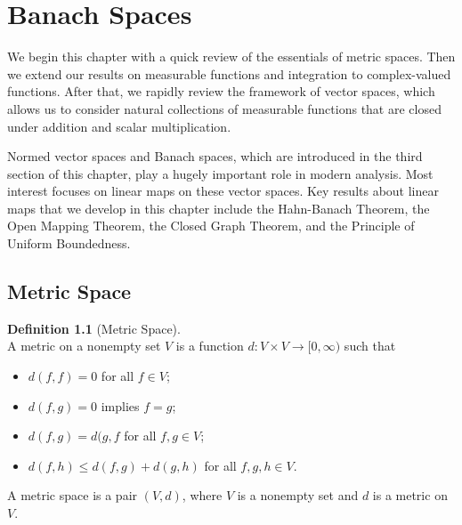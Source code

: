 \documentclass[12pt]{book}
\theoremstyle{definition}
\newtheorem{definition}{Definition}[chapter]
\begin{document}
\chapter{Banach Spaces}
We begin this chapter with a quick review of the essentials of metric spaces. Then we extend our results on measurable functions and integration to complex-valued functions. After that, we rapidly review the framework of vector spaces, which allows us to consider natural collections of measurable functions that are closed under addition and scalar multiplication.

Normed vector spaces and Banach spaces, which are introduced in the third section of this chapter, play a hugely important role in modern analysis. Most interest focuses on linear maps on these vector spaces. Key results about linear maps that we develop in this chapter include the Hahn-Banach Theorem, the Open Mapping Theorem, the Closed Graph Theorem, and the Principle of Uniform Boundedness.
\newpage
\section{Metric Space}
\begin{definition}[Metric Space] \ \\
A metric on a nonempty set $V$ is a function $d:V\times V \to [0,\infty)$ such that
\begin{itemize}
	\item $d(f,f)=0$ for all $f\in V$;
	\item $d(f,g)=0$ implies $f=g$;
	\item $d(f,g)=d(g,f$ for all $f,g \in V$;
	\item $d(f,h)\leq d(f,g)+d(g,h)$ for all $f,g,h \in V$. 
\end{itemize}
A metric space is a pair $(V,d)$, where $V$ is a nonempty set and $d$ is a metric on $V$.
\end{definition}
\end{document}

